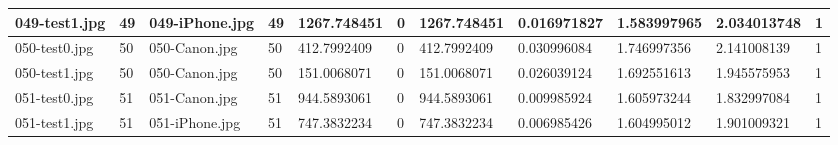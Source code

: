 \begin{landscape}
\begin{longtable}{|p{2cm}|p{1cm}|p{2cm}|p{1cm}|p{2cm}|p{1cm}|p{2cm}|p{2cm}|p{2cm}|p{2cm}|p{1cm}|}
	\hline
	049-test1.jpg & 49       & 049-iPhone.jpg & 49                   & 1267.748451   & 0                & 1267.748451         & 0.016971827   & 1.583997965   & 2.034013748       & 1         \\ 
	\hline
	050-test0.jpg & 50       & 050-Canon.jpg  & 50                   & 412.7992409   & 0                & 412.7992409         & 0.030996084   & 1.746997356   & 2.141008139       & 1         \\ 
	\hline
	050-test1.jpg & 50       & 050-Canon.jpg  & 50                   & 151.0068071   & 0                & 151.0068071         & 0.026039124   & 1.692551613   & 1.945575953       & 1         \\ 
	\hline
	051-test0.jpg & 51       & 051-Canon.jpg  & 51                   & 944.5893061   & 0                & 944.5893061         & 0.009985924   & 1.605973244   & 1.832997084       & 1         \\ 
	\hline
	051-test1.jpg & 51       & 051-iPhone.jpg & 51                   & 747.3832234   & 0                & 747.3832234         & 0.006985426   & 1.604995012   & 1.901009321       & 1         \\
	\hline
\end{longtable}
\end{landscape}


